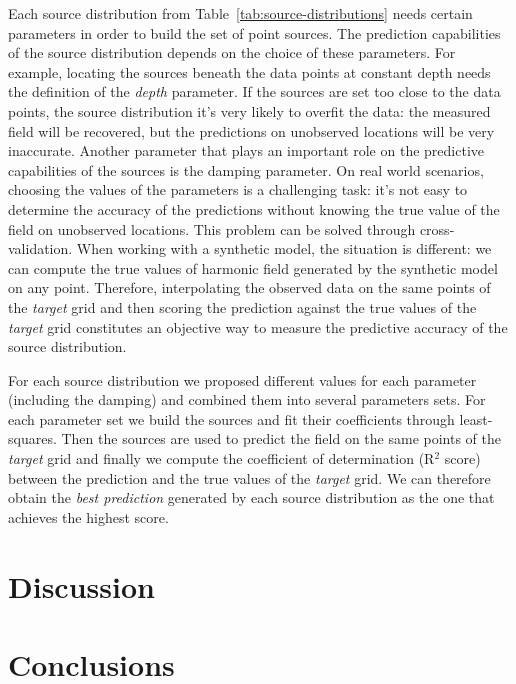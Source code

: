 \documentclass[twocolumn]{article}
\begin{document}
Each source distribution from Table~\ref{tab:source-distributions} needs
certain parameters in order to build the set of point sources.
The prediction capabilities of the source distribution depends on the choice of
these parameters.
For example, locating the sources beneath the data points at constant depth
needs the definition of the \emph{depth} parameter.
If the sources are set too close to the data points, the source distribution
it's very likely to overfit the data: the measured field will be recovered, but
the predictions on unobserved locations will be very inaccurate.
Another parameter that plays an important role on the predictive capabilities
of the sources is the damping parameter.
On real world scenarios, choosing the values of the parameters is a challenging
task: it's not easy to determine the accuracy of the predictions without
knowing the true value of the field on unobserved locations.
This problem can be solved through cross-validation.
When working with a synthetic model, the situation is different: we can compute
the true values of harmonic field generated by the synthetic model on any
point.
Therefore, interpolating the observed data on the same points of the
\emph{target} grid and then scoring the prediction against the true values of
the \emph{target} grid constitutes an objective way to measure the predictive
accuracy of the source distribution.

For each source distribution we proposed different values for each parameter
(including the damping) and combined them into several parameters sets.
For each parameter set we build the sources and fit their coefficients through
least-squares.
Then the sources are used to predict the field on the same points of the
\emph{target} grid and finally we compute the coefficient of determination
(R$^2$ score) between the prediction and the true values of the \emph{target}
grid.
We can therefore obtain the \emph{best prediction} generated by each source
distribution as the one that achieves the highest score.


\section{Discussion}


\section{Conclusions}
\end{document}
